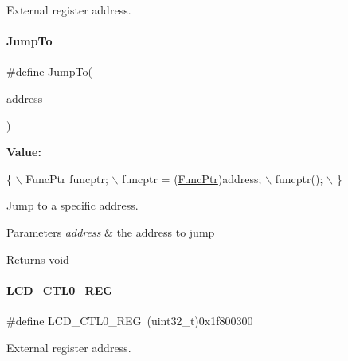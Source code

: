 External register address. \mbox{\label{a00020_a38c3a81fc94bff4cb6654061b7d21909}} 
\paragraph{\texorpdfstring{Jump\+To}{JumpTo}}
{\footnotesize\ttfamily \#define Jump\+To(\begin{DoxyParamCaption}\item[{}]{address }\end{DoxyParamCaption})}

{\bfseries Value\+:}
\begin{DoxyCode}
\{                               \(\backslash\)
        FuncPtr funcptr;            \(\backslash\)
        funcptr = (\mbox{\hyperlink{a00020_a3d987633d7a3ca10c14905a807b62eb1}{FuncPtr}})address; \(\backslash\)
        funcptr();                  \(\backslash\)
    \}
\end{DoxyCode}


Jump to a specific address. 


\begin{DoxyParams}{Parameters}
{\em address} & the address to jump \\
\hline
\end{DoxyParams}
\begin{DoxyReturn}{Returns}
void 
\end{DoxyReturn}
\mbox{\label{a00020_adc8a1acb1d3dc976ed3747d978e7b46e}} 
\paragraph{\texorpdfstring{L\+C\+D\+\_\+\+C\+T\+L0\+\_\+\+R\+EG}{LCD\_CTL0\_REG}}
{\footnotesize\ttfamily \#define L\+C\+D\+\_\+\+C\+T\+L0\+\_\+\+R\+EG~(uint32\+\_\+t)0x1f800300}

External register address. \mbox{\label{a00020_a126a24a9996154747b8a9b515583d405}} 
